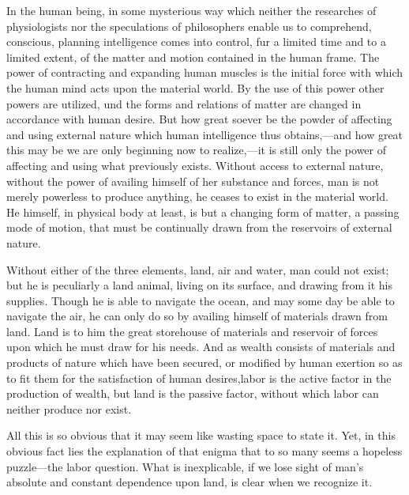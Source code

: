 \documentclass{book}
\begin{document}
In the human being, in some mysterious way which neither the researches of physiologists nor the speculations of philosophers enable us to comprehend, conscious, planning intelligence comes into control, fur a limited time and to a limited extent, of the matter and motion contained in the human frame. The power of contracting and expanding human muscles is the initial force with which the human mind acts upon the material world. By the use of this power other powers are utilized, und the forms and relations of matter are changed in accordance with human desire. But how great soever be the powder of affecting and using external nature which human intelligence thus obtains,—and how great this may be we are only beginning now to realize,—it is still only the power of affecting and using what previously exists. Without access to external nature, without the power of availing himself of her substance and forces, man is not merely powerless to produce anything, he ceases to exist in the material world. He himself, in physical body at least, is but a changing form of matter, a passing mode of motion, that must be continually drawn from the reservoirs of external nature.

Without either of the three elements, land, air and water, man could not exist; but he is peculiarly a land animal, living on its surface, and drawing from it his supplies. Though he is able to navigate the ocean, and may some day be able to navigate the air, he can only do so by availing himself of materials drawn from land. Land is to him the great storehouse of materials and reservoir of forces upon which he must draw for his needs. And as wealth consists of materials and products of nature which have been secured, or modified by human exertion so as to fit them for the satisfaction of human desires,\footnotemark[1] labor is the active factor in the production of wealth, but land is the passive factor, without which labor can neither produce nor exist.

All this is so obvious that it may seem like wasting space to state it. Yet, in this obvious fact lies the explanation of that enigma that to so many seems a hopeless puzzle—the labor question. What is inexplicable, if we lose sight of man’s absolute and constant dependence upon land, is clear when we recognize it.
\end{document}
